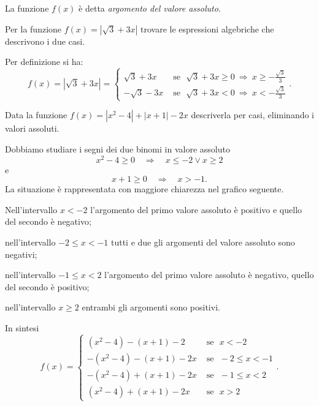 La funzione $f(x)$ è detta \textit{argomento del valore assoluto}.

\begin{exrig}
\begin{esempio}
Per la funzione $f(x)=\left|\sqrt 3+3x\right|$ trovare le espressioni algebriche che descrivono i due casi.

Per definizione si ha: 
\[f(x)=\left|\sqrt 3+3x\right|=\begin{cases}\sqrt 3+3x & \text{ se~~}\sqrt 3+3x\ge 0\:\Rightarrow\: x\ge -\frac{\sqrt 3} 3\\-\sqrt 3-3x & \text{ se~~}\sqrt 3+3x<0\:\Rightarrow\: x<-\frac{\sqrt 3} 3\end{cases}.\]
\end{esempio}

\begin{esempio}
Data la funzione $f(x)=\left|x^2-4\right|+\left|x+1\right|-2x$ descriverla per casi, eliminando i valori assoluti.

Dobbiamo studiare i segni dei due binomi in valore assoluto 
\[x^2-4\ge 0\quad\Rightarrow\quad x\le -2\vee x\ge 2\] e \[x+1\ge 0\quad\Rightarrow\quad x>-1.\] 
La situazione è rappresentata con maggiore chiarezza nel grafico seguente.
\begin{center}

\end{center}

\begin{itemize*}
\item Nell'intervallo $x<-2$ l'argomento del primo valore assoluto è positivo e quello del secondo è negativo;
\item nell'intervallo $-2\le x<-1$ tutti e due gli argomenti del valore assoluto sono negativi;
\item nell'intervallo $-1\le x<2$ l'argomento del primo valore assoluto è negativo, quello del secondo è positivo;
\item nell'intervallo $x\ge 2$ entrambi gli argomenti sono positivi.
\end{itemize*}
In sintesi 
\[f(x)=
\begin{cases}(x^2-4)-(x+1)-2 & \text{ se~~}x<-2 \\
-(x^2-4)-(x+1)-2x & \text{ se~~}-2\le x<-1 \\
-(x^2-4)+(x+1)-2x & \text{ se~~}-1\le x<2 \\
(x^2-4)+(x+1)-2x & \text{ se~~}x>2
\end{cases}.\]
\end{esempio}
\end{exrig}
\ovalbox{\risolvii \ref{ese:7.1}, \ref{ese:7.2}, \ref{ese:7.3}}

